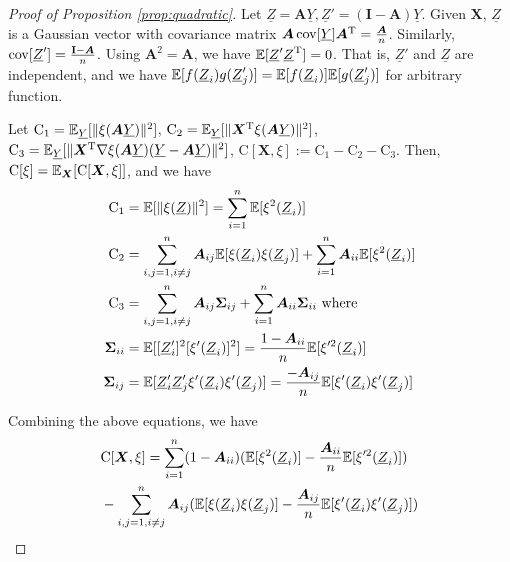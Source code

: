 \documentclass[appliedmath,article,accept,pdftex,moreauthors]{Definitions/mdpi}
\begin{document}
\begin{proof}[Proof of Proposition \ref{prop:quadratic}]
Let $\underline{Z} = \bm{A}\underline{Y}, \underline{Z}' = (\mathbf{I} - \bm{A})\underline{Y}$. Given $\bm{X}$, $\underline{Z}$ is a Gaussian vector with covariance matrix $\bm{A} \operatorname*{cov}[\underline{Y}] \bm{A}^{\mathrm{T}} = \frac{\bm{A}}{n}$. Similarly, $\operatorname*{cov}[\underline{Z}'] = \frac{\mathbf{I} - \bm{A}}{n}$. Using $\bm{A}^2 = \bm{A}$, we have $\mathbb{E}[\underline{Z}'\underline{Z}^{\mathrm{T}}] = 0$. That is, $\underline{Z}'$ and $\underline{Z}$ are independent, and we have $\mathbb{E}[f(\underline{Z}_i)g(\underline{Z}'_j)] = \mathbb{E}[f(\underline{Z}_i)]\mathbb{E}[g(\underline{Z}'_j)]$ for arbitrary function.
    
Let $\mathrm{C}_1 = \mathbb{E}_{\underline{Y}} [\lVert\xi(\bm{A}\underline{Y})\rVert^2]$, $\mathrm{C}_2 
= \mathbb{E}_{\underline{Y}}
[\lVert\bm{X}^{\mathrm{T}}\xi(\bm{A}\underline{Y})\rVert^2]$, $\mathrm{C}_3 
= \mathbb{E}_{\underline{Y}}
[\lVert\bm{X}^{\mathrm{T}} \nabla\xi(\bm{A}\underline{Y})(\underline{Y}-\bm{A}\underline{Y})\rVert^2]$,
$\mathrm{C}[\bm{X}, \xi] :=  \mathrm{C}_1 - \mathrm{C}_2 - \mathrm{C}_3$. Then, $\mathrm{C}[\xi] = \mathbb{E}_{\bm{X}}[\mathrm{C}[\bm{X}, \xi]]$,
and we have
\begin{align*}
    \mathrm{C}_1 &=\mathbb{E}[\lVert\xi(\underline{Z})\rVert^2] = \sum_{i=1}^n \mathbb{E}[\xi^2(\underline{Z}_i)] \\
    \mathrm{C}_2 &= \sum_{i,j=1, i \neq j}^n \bm{\bm{A}}_{ij}\mathbb{E}[\xi(\underline{Z}_i)\xi(\underline{Z}_j)] +
    \sum_{i=1}^n \bm{\bm{A}}_{ii}  \mathbb{E}[\xi^2(\underline{Z}_i)]\\
    \mathrm{C}_3 & = \sum_{i,j=1, i \neq j}^n \bm{A}_{ij}\bm{\Sigma}_{ij} +
    \sum_{i=1}^n \bm{A}_{ii}\bm{\Sigma}_{ii}     \textrm{ where }\\
    \bm{\Sigma}_{ii} &=  \mathbb{E}[ [\underline{Z}'_i]^2 [\xi'(\underline{Z}_i)]^2] = \frac{1-\bm{A}_{ii}}{n}\mathbb{E}[\xi'^2(\underline{Z}_i)]   \\
    \bm{\Sigma}_{ij} &=  \mathbb{E}[\underline{Z}'_i \underline{Z}'_j \xi'(\underline{Z}_i)
    \xi'(\underline{Z}_j)]
     =  \frac{-\bm{A}_{ij}}{n} \mathbb{E}[ \xi'(\underline{Z}_i)
    \xi'(\underline{Z}_j)]
\end{align*}

{Combining} the above equations, we have
\begin{align*}
   &  \mathrm{C}[\bm{X}, \xi] = \sum_{i=1}^n (1-\bm{A}_{ii})(\mathbb{E}[\xi^2(\underline{Z}_i)] -
    \frac{ \bm{A}_{ii}}{n} \mathbb{E}[ \xi'^2(\underline{Z}_i)]) \\
    &- \sum_{i,j=1, i \neq j}^n \bm{A}_{ij} (\mathbb{E}[\xi(\underline{Z}_i)\xi(\underline{Z}_j)] -
    \frac{\bm{A}_{ij}}{n}\mathbb{E}[\xi'(\underline{Z}_i) \xi'(\underline{Z}_j)])
\end{align*}


\end{proof}
\end{document}
